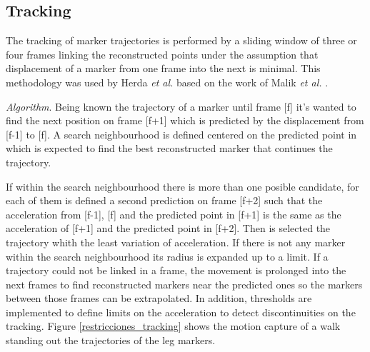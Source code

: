\subsection{Tracking}

The tracking of marker trajectories is performed by a sliding window of three or four frames linking the reconstructed points under the assumption that displacement of a marker from one frame into the next is minimal. This methodology was used by Herda \textit{et al.} \cite{herda} based on the work of Malik \textit{et al.} \cite{griegos}.

\hspace*{0.5cm} \textit{Algorithm}. Being known the trajectory of a marker until frame [f]  it's wanted to find the next position on frame [f+1] which is predicted by the displacement from [f-1] to [f]. A search neighbourhood is defined centered on the predicted point in which is expected to find the best reconstructed marker that continues the trajectory.

If within the search neighbourhood there is more than one posible candidate, for each of them is defined a second prediction on frame [f+2] such that the acceleration from [f-1], [f] and the predicted point in [f+1] is the same as the acceleration of [f+1] and the predicted point in [f+2]. Then is selected the trajectory whith the least variation of acceleration. If there is not any marker within the search neighbourhood  its radius is expanded up to a limit. If a trajectory could not be linked in a frame, the movement is prolonged into the next frames to find reconstructed markers near the predicted ones so the markers between those frames can be extrapolated. In addition, thresholds are implemented to define limits on the acceleration to detect discontinuities on the tracking. Figure \ref{restricciones_tracking} shows the motion capture of a walk standing out the trajectories of the leg markers.

